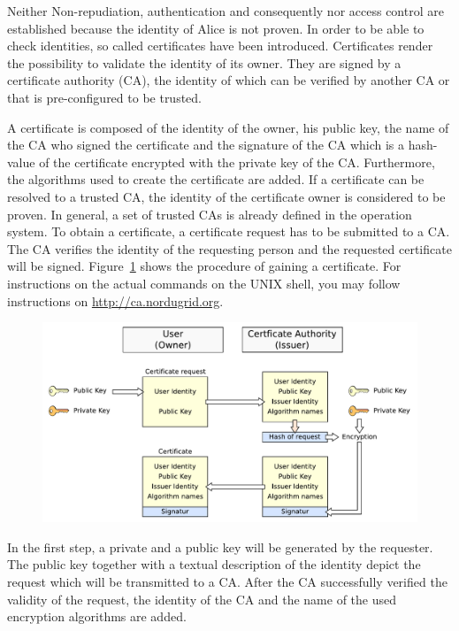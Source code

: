 Neither Non-repudiation, authentication and consequently nor access control are established because the identity of Alice is not proven.
In order to be able to check identities, so called certificates have been introduced.
Certificates render the possibility to validate the identity of its owner.
They are signed by a certificate authority (CA), the identity of which can be verified by another CA or that is pre-configured to be trusted.

A certificate is composed of the identity of the owner, his public key, the name of the CA who signed the certificate and the signature of the CA which is a hash-value of the certificate encrypted with the private key of the CA. 
Furthermore, the algorithms used to create the certificate are added.
If a certificate can be resolved to a trusted CA, the identity of the certificate owner is considered to be proven. 
In general, a set of trusted CAs is already defined in the operation system.
To obtain a certificate, a certificate request has to be submitted to a CA.
The CA verifies the identity of the requesting person and the requested certificate will be signed.
Figure~\ref{fig:certificate_request} shows the procedure of gaining a certificate.
For instructions on the actual commands on the UNIX shell, you may follow instructions on \url{http://ca.nordugrid.org}.
\begin{figure}[htb]
	\centering%
 	\includegraphics[width=13cm]{tex_tls_echoservice/certificates.pdf}
	\label{fig:certificate_request}
\end{figure}
In the first step, a private and a public key will be generated by the requester.
The public key together with a textual description of the identity depict the request which will be transmitted to a CA.
After the CA successfully verified the validity of the request, the identity of the CA and the name of the used encryption algorithms are added.
